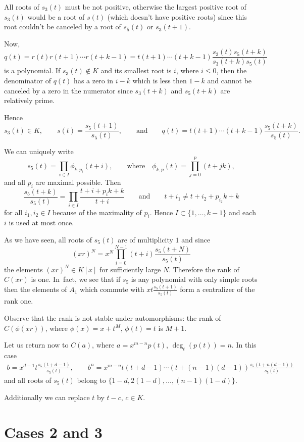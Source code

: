 \documentclass[10pt,a4paper]{amsart}
\numberwithin{equation}{section}
\begin{document}
All roots of $s_3(t)$ must be not positive, otherwise the largest positive root of $s_3(t)$ would be a root of $s(t)$ (which doesn't have positive roots) since this root
couldn't be canceled by a root of $s_5(t)$ or $s_3(t+1)$.

Now,
\[
q(t) = r(t)r(t+1)\cdots r(t + k - 1) = t(t+1)\cdots(t+k-1)\frac{s_3(t)s_5(t+k)}{s_3(t+k)s_5(t)}
\]
is a polynomial. If $s_3(t) \not\in K$ and its smallest root is $i$, where $i \leq 0$, then the denominator of $q(t)$ has a zero in $i-k$ which is less then $1 - k$ and cannot be canceled by a zero in the numerator since $s_3(t+k)$ and $s_5(t+k)$ are relatively prime.

Hence
\[
s_3(t) \in K, \qquad
s(t) = \frac{s_5(t+1)}{s_5(t)},\qquad \text{and}\qquad
q(t) = t(t+1)\cdots(t+k-1) \frac{s_5(t+k)}{s_5(t)}.
\]

We can uniquely write
\[
s_5(t) = \prod_{i \in I}\phi_{k, p_i}(t+i), \qquad \text{where}\quad
\phi_{k,p}(t) = \prod_{j=0}^{p} (t + jk),
\]
and all $p_i$ are maximal possible.
Then
\[
\frac{s_5(t+k)}{s_5(t)} = \prod_{i \in I} \frac{t + i + p_ik + k}{t + i}\qquad
\text{and}\qquad
t + i_1 \neq t + i_2 + p_{i_2}k + k
\]
for all $i_1, i_2 \in I$ because of the
maximality of $p_i$. Hence $I \subset \{1, \dots, k-1\}$ and each $i$ is used at most once.

As we have seen, all roots of $s_5(t)$ are of multiplicity $1$
and since
\[
(xr)^N = x^N\prod_{i=0}^{N-1}(t+i)\frac{s_5(t+N)}{s_5(t)}
\]
the elements $(xr)^N \in K[x]$ for sufficiently large $N$. Therefore the rank of $C(xr)$ is one.
In~fact, we see that if $s_5$ is any polynomial with only simple roots then the elements of $A_1$ which commute with $xt\frac{s_5(t+1)}{s_5(t)}$ form a centralizer of the rank one.

Observe that the rank is not stable under automorphisms: the rank of $C(\phi(xr))$, where $\phi(x) = x + t^M$, $\phi(t) = t$ is $M + 1$.

Let us return now to $C(a)$, where $a = x^{m-n}p(t)$, $\deg_t(p(t)) = n$. In this case
\begin{gather*}
b = x^{d-1}t\frac{s_5(t+d-1)}{s_5(t)},
\qquad
b^n = x^{m-n}t(t + d -1)\cdots(t + (n-1)(d-1))\frac{s_5(t+n(d-1))}{s_5(t)}
\end{gather*}
and all roots of $s_5(t)$ belong to $\{1 - d, 2(1 - d), \dots, (n-1)(1-d)\}$.

Additionally we can replace $t$ by $t - c$, $c \in K$.

\section{Cases 2 and 3}
\end{document}
